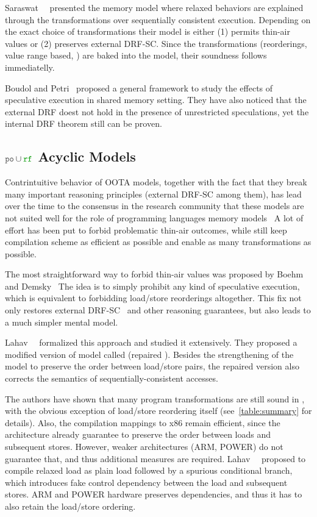 Saraswat~\etal~\cite{Saraswat-al:PPoPP07} presented the \RAO memory model
where relaxed behaviors are explained through the transformations 
over sequentially consistent execution.
Depending on the exact choice of transformations 
their model is either (1) permits thin-air values or 
(2) preserves external DRF-SC. 
Since the transformations (\eg reorderings, value range based, \etc)
are baked into the model, their soundness follows immediatelly.  

Boudol and Petri~\cite{Boudol-Petri:ESOP10} proposed a general 
framework to study the effects of speculative execution in
shared memory setting. 
They have also noticed that the external DRF doest not 
hold in the presence of unrestricted speculations, 
yet the internal DRF theorem still can be proven. 

\subsection{$\lPO\cup\lRF$ Acyclic Models}
\label{sec:porf-acyc}

Contrintuitive behavior of OOTA models, together with the fact that they break 
many important reasoning principles (external DRF-SC among them), 
has lead over the time to the consensus in the research community that these models 
are not suited well for the role of 
programming languages memory models~\cite{Boehm-Demsky:MSPC14, Batty-al:ESOP15}
A lot of effort has been put to forbid problematic 
thin-air outcomes, while still keep compilation scheme as efficient as possible
and enable as many transformations as possible.

The most straightforward way to forbid thin-air values 
was proposed by Boehm and Demsky~\cite{Boehm-Demsky:MSPC14}
The idea is to simply prohibit any kind of speculative execution, 
which is equivalent to forbidding load/store reorderings altogether. 
This fix not only restores external DRF-SC~\cite{Lahav-al:PLDI17}
and other reasoning guarantees, but also leads to 
a much simpler mental model.  

Lahav~\etal~\cite{Lahav-al:PLDI17} formalized this approach and 
studied it extensively. They proposed a modified version 
of \CPP model called \RCMM (repaired \CMM).  
Besides the strengthening of the model to preserve 
the order between load/store pairs, 
the repaired version also corrects the semantics 
of sequentially-consistent accesses.

The authors have shown that many 
program transformations are still sound in \RCMM, 
with the obvious exception of load/store reordering itself
(see~\cref{table:summary} for details).
Also, the compilation mappings to x86 remain efficient, 
since the architecture already guarantee to preserve the order 
between loads and subsequent stores. 
However, weaker architectures (ARM, POWER) do not guarantee that, 
and thus additional measures are required.
Lahav~\etal~\cite{Lahav-al:PLDI17} proposed to compile relaxed load 
as plain load followed by a spurious conditional branch,
which introduces fake control dependency between 
the load and subsequent stores. 
ARM and POWER hardware preserves dependencies, 
and thus it has to also retain the load/store ordering. 

